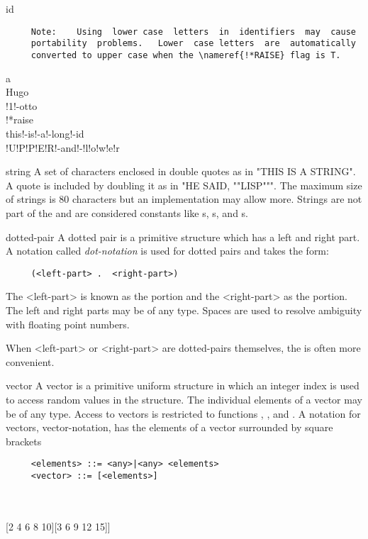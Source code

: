 \begin{Type}{id}
\begin{verbatim}
     Note:    Using  lower case  letters  in  identifiers  may  cause
     portability  problems.   Lower  case letters  are  automatically
     converted to upper case when the \nameref{!*RAISE} flag is T.
\end{verbatim}

\begin{Examples}
a\\
Hugo\\
!1!-otto\\
!*raise\\
this!-is!-a!-long!-id\\
!U!P!P!E!R!-and!-!l!o!w!e!r\\
\end{Examples}
\end{Type}


\begin{Type}{string}
A set of characters enclosed in double quotes as
in "THIS IS A STRING". A quote is included by doubling it as in "HE
SAID, ""LISP""". The maximum size of strings is 80 characters but an
implementation may allow more. Strings are not part of the  and
are considered constants like s, s, 
and s.
\end{Type}

\begin{Type}{dotted-pair}
A dotted pair is a primitive structure which has a left and right part.
A notation called {\em dot-notation} is used for dotted pairs and
takes the form:
\begin{verbatim}
     (<left-part> .  <right-part>)
\end{verbatim}

The <left-part> is known as the  portion and the
<right-part> as the  portion. The left and right parts may be of any type.
Spaces are used to resolve ambiguity with floating point numbers.

When <left-part> or <right-part> are dotted-pairs themselves,
the  is often more convenient.
\end{Type}

\begin{Type}{vector}
A vector is a primitive uniform structure in which
an integer index is used to access random values in the structure. The
individual elements of a vector may be of any type. Access to vectors
is restricted to functions , , and 
.
A notation  for vectors, vector-notation, has  the
elements of a vector surrounded by square brackets
\begin{verbatim}                                                     
     <elements> ::= <any>|<any> <elements>
     <vector> ::= [<elements>]
\end{verbatim}
\begin{Examples}
[1 2 3 5 7 11 13 17 19 23]\\
[nil (a) (a . a)]\\
[[1 2 3 4 5][2 4 6 8 10][3 6 9 12 15]]\\
\end{Examples}
\end{Type}

